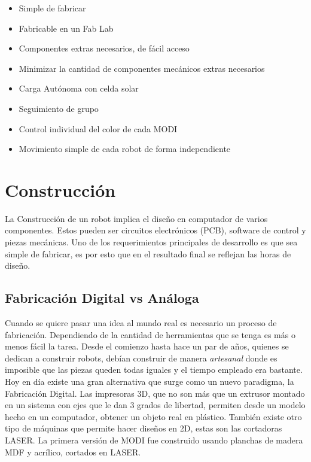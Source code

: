 \begin{itemize}
\item Simple de fabricar
\item Fabricable en un Fab Lab
\item Componentes extras necesarios, de fácil acceso
\item Minimizar la cantidad de componentes mecánicos extras necesarios
\item Carga Autónoma con celda solar
\item Seguimiento de grupo
\item Control individual del color de cada MODI
\item Movimiento simple de cada robot de forma independiente
\end{itemize}


\section{Construcción}

La Construcción de un robot implica el diseño en computador de varios componentes. Estos pueden ser circuitos electrónicos (PCB), software de control y piezas mecánicas. Uno de los requerimientos principales de desarrollo es que sea simple de fabricar, es por esto que en el resultado final se reflejan las horas de diseño.

\subsection{Fabricación Digital vs Análoga}
Cuando se quiere pasar una idea al mundo real es necesario un proceso de fabricación. Dependiendo de la cantidad de herramientas que se tenga es más o menos fácil la tarea. Desde el comienzo hasta hace un par de años, quienes se dedican a construir robots, debían construir de manera \textit{artesanal} donde es imposible que las piezas queden todas iguales y el tiempo empleado era bastante. Hoy en día existe una gran alternativa que surge como un nuevo paradigma, la Fabricación Digital. Las impresoras 3D, que no son más que un extrusor montado en un sistema con ejes que le dan 3 grados de libertad, permiten desde un modelo hecho en un computador, obtener un objeto real en plástico. También existe otro tipo de máquinas que permite hacer diseños en 2D, estas son las cortadoras LASER. La primera versión de MODI fue construido usando planchas de madera MDF y acrílico, cortados en LASER.

